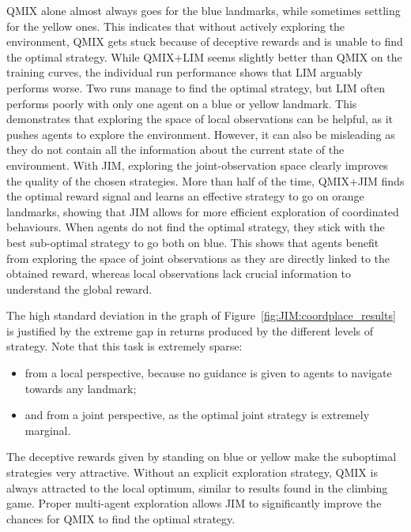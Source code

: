 QMIX alone almost always goes for the blue landmarks, while sometimes settling for the yellow ones. This indicates that without actively exploring the environment, QMIX gets stuck because of deceptive rewards and is unable to find the optimal strategy. While QMIX+LIM seems slightly better than QMIX on the training curves, the individual run performance shows that LIM arguably performs worse. Two runs manage to find the optimal strategy, but LIM often performs poorly with only one agent on a blue or yellow landmark. This demonstrates that exploring the space of local observations can be helpful, as it pushes agents to explore the environment. However, it can also be misleading as they do not contain all the information about the current state of the environment. With JIM, exploring the joint-observation space clearly improves the quality of the chosen strategies. More than half of the time, QMIX+JIM finds the optimal reward signal and learns an effective strategy to go on orange landmarks, showing that JIM allows for more efficient exploration of coordinated behaviours. When agents do not find the optimal strategy, they stick with the best sub-optimal strategy to go both on blue. This shows that agents benefit from exploring the space of joint observations as they are directly linked to the obtained reward, whereas local observations lack crucial information to understand the global reward. 

The high standard deviation in the graph of Figure~\ref{fig:JIM:coordplace_results} is justified by the extreme gap in returns produced by the different levels of strategy. Note that this task is extremely sparse:
\begin{itemize}
    \item from a local perspective, because no guidance is given to agents to navigate towards any landmark;
    \item and from a joint perspective, as the optimal joint strategy is extremely marginal.
\end{itemize}
The deceptive rewards given by standing on blue or yellow make the suboptimal strategies very attractive. Without an explicit exploration strategy, QMIX is always attracted to the local optimum, similar to results found in the climbing game. Proper multi-agent exploration allows JIM to significantly improve the chances for QMIX to find the optimal strategy. 

